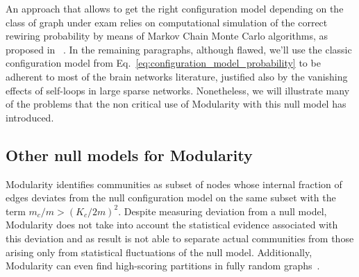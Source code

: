 An approach that allows to get the right configuration model depending on the class of graph under exam relies on computational simulation of the correct rewiring probability by means of Markov Chain Monte Carlo algorithms, as proposed in ~\cite{Fosdick2016}.
In the remaining paragraphs, although flawed, we'll use the classic configuration model from Eq.~\ref{eq:configuration_model_probability} to be adherent to most of the brain networks literature, justified also by the vanishing effects of self-loops in large sparse networks. Nonetheless, we will illustrate many of the problems that the non critical use of Modularity with this null model has introduced.

\subsection{Other null models for Modularity}
Modularity identifies communities as subset of nodes whose internal fraction of edges deviates from the null configuration model on the same subset with the term $m_c/m > (K_c/2m)^2$.
Despite measuring deviation from a null model, Modularity does not take into account the statistical evidence associated with this deviation and as result is not able to separate actual communities from those arising only from statistical fluctuations of the null model. Additionally, Modularity can even find high-scoring partitions in fully random graphs~\cite{Guimera2004}.


